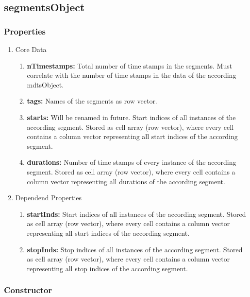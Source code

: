 \documentclass[a4]{scrreprt}
\begin{document}
\subsection{segmentsObject}
\label{ChpDescriptionSegmentsObject}

\subsubsection{Properties}
\begin{enumerate}
	\item Core Data
	\begin{enumerate}
		\item \textbf{nTimestamps:} Total number of time stamps in the segments. Must correlate with the number of time stamps in the data of the according mdtsObject.
		\item \textbf{tags:} Names of the segments as row vector.
		\item \textbf{starts:} Will be renamed in future. Start indices of all instances of the according segment. Stored as cell array (row vector), where every cell contains a column vector representing all start indices of the according segment.
		\item \textbf{durations:} Number of time stamps of every instance of the according segment. Stored as cell array (row vector), where every cell contains a column vector representing all durations of the according segment.
	\end{enumerate}

	\item Dependend Properties
	\begin{enumerate}
		\item \textbf{startInds:} Start indices of all instances of the according segment. Stored as cell array (row vector), where every cell contains a column vector representing all start indices of the according segment. 
		\item \textbf{stopInds:} Stop indices of all instances of the according segment. Stored as cell array (row vector), where every cell contains a column vector representing all stop indices of the according segment.
	\end{enumerate}
	
\end{enumerate}

\subsubsection{Constructor}
\end{document}
